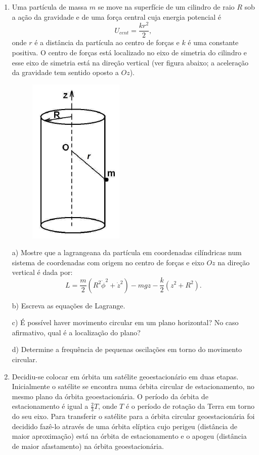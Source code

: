 \begin{enumerate}[start=1,label={\bfseries Q\arabic*.}]
\item Uma partícula de massa $m$ se move na superfície de um cilindro de raio $R$ sob a ação da gravidade e de uma força central cuja energia potencial é
$$
U_{cent} = \frac{kr^{2}}{2},
$$
onde $r$ é a distância da partícula ao centro de forças e $k$ é uma constante positiva. O centro de forças está localizado no eixo de simetria do cilindro e esse eixo de simetria está na direção vertical (ver figura abaixo; a aceleração da gravidade tem sentido oposto a $Oz$).
\begin{figure}[H]
\centering
\includegraphics[scale=0.7]{classica-img/cilindro.png}
\end{figure}


a) Mostre que a lagrangeana da partícula em coordenadas cilíndricas num sistema de coordenadas com origem no centro de forças e eixo $Oz$ na direção vertical é dada por:
$$
L  = \frac{m}{2} (R^{2} \dot{\phi}^{2} + \dot{z}^{2} ) - mgz - \frac{k}{2} (z^{2} + R^{2}).
$$

\resposta

b) Escreva as equações de Lagrange.

\resposta

c) É possível haver movimento circular em um plano horizontal? No caso afirmativo, qual é a localização do plano?

\resposta

d) Determine a frequência de pequenas oscilações em torno do movimento circular.

\resposta



\item Decidiu-se colocar em órbita um satélite geoestacionário em duas etapas. Inicialmente o satélite se encontra numa órbita circular de estacionamento, no mesmo plano da órbita geoestacionária. O período da órbita de estacionamento é igual a $\frac{2}{3}T$, onde $T$ é o período de rotação da Terra em torno do seu eixo. Para transferir o satélite para a órbita circular geoestacionária foi decidido fazê-lo através de uma órbita elíptica cujo perigeu (distância de maior aproximação) está na órbita de estacionamento e o apogeu (distância de maior afastamento) na órbita geoestacionária.


\end{enumerate}
